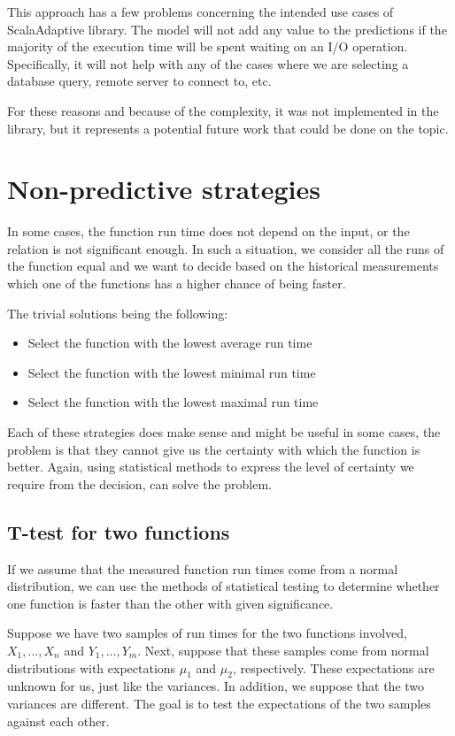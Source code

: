 This approach has a few problems concerning the intended use cases of ScalaAdaptive library. The model will not add any value to the predictions if the majority of the execution time will be spent waiting on an I/O operation. Specifically, it will not help with any of the cases where we are selecting a database query, remote server to connect to, etc.

For these reasons and because of the complexity, it was not implemented in the library, but it represents a potential future work that could be done on the topic.

\section{Non-predictive strategies}
\label{sec:non_predictive_strategies}

In some cases, the function run time does not depend on the input, or the relation is not significant enough. In such a situation, we consider all the runs of the function equal and we want to decide based on the historical measurements which one of the functions has a higher chance of being faster.

The trivial solutions being the following:
\begin{itemize}
	\item Select the function with the lowest average run time
	\item Select the function with the lowest minimal run time
	\item Select the function with the lowest maximal run time
\end{itemize}

Each of these strategies does make sense and might be useful in some cases, the problem is that they cannot give us the certainty with which the function is better. Again, using statistical methods to express the level of certainty we require from the decision, can solve the problem.

\subsection{T-test for two functions}
\label{subsec:t_test_two}

If we assume that the measured function run times come from a normal distribution, we can use the methods of statistical testing to determine whether one function is faster than the other with given significance. 

Suppose we have two samples of run times for the two functions involved, $X_1, ..., X_n$ and $Y_1, ..., Y_m$. Next, suppose that these samples come from normal distributions with expectations $\mu_1$ and $\mu_2$, respectively. These expectations are unknown for us, just like the variances. In addition, we suppose that the two variances are different. The goal is to test the expectations of the two samples against each other.

